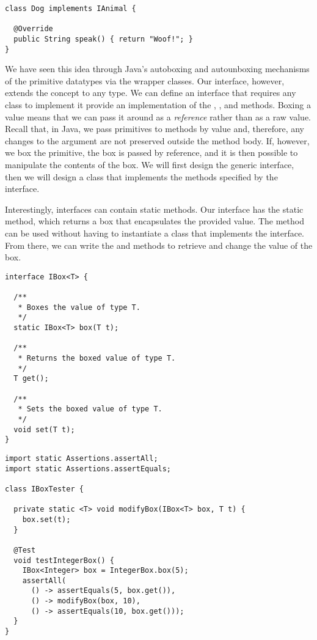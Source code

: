 \begin{lstlisting}[language=MyJava]
class Dog implements IAnimal {

  @Override
  public String speak() { return "Woof!"; }
}
\end{lstlisting}

\newpage %
We have seen this idea through Java's autoboxing and autounboxing mechanisms of the primitive datatypes via the wrapper classes. 
Our interface, however, extends the concept to any type. 
We can define an interface that requires any class to implement it provide an implementation of the , , and  methods. 
Boxing a value means that we can pass it around as a \emph{reference} rather than as a raw value. 
Recall that, in Java, we pass primitives to methods by value and, therefore, any changes to the argument are not preserved outside the method body. 
If, however, we box the primitive, the box is passed by reference, and it is then possible to manipulate the contents of the box. 
We will first design the generic  interface, then we will design a class that implements the methods specified by the interface.

Interestingly, interfaces can contain static methods. 
Our  interface has the static  method, which returns a box that encapsulates the provided value. 
The  method can be used without having to instantiate a class that implements the  interface. 
From there, we can write the  and  methods to retrieve and change the value of the box.

\begin{lstlisting}[language=MyJava]
interface IBox<T> {
  
  /**
   * Boxes the value of type T.
   */
  static IBox<T> box(T t);

  /**
   * Returns the boxed value of type T.
   */
  T get();

  /**
   * Sets the boxed value of type T.
   */
  void set(T t);
}
\end{lstlisting}

\begin{lstlisting}[language=MyJava]
import static Assertions.assertAll;
import static Assertions.assertEquals;

class IBoxTester {

  private static <T> void modifyBox(IBox<T> box, T t) {
    box.set(t);
  }
  
  @Test
  void testIntegerBox() {
    IBox<Integer> box = IntegerBox.box(5);
    assertAll(
      () -> assertEquals(5, box.get()),
      () -> modifyBox(box, 10),
      () -> assertEquals(10, box.get()));
  }
}
\end{lstlisting}

